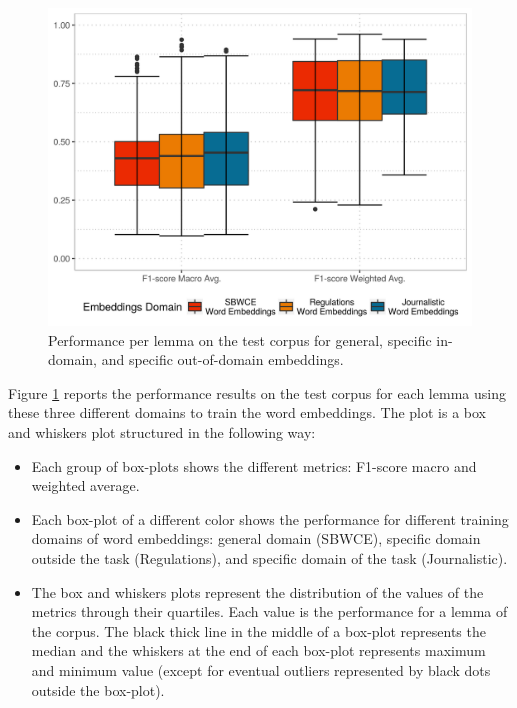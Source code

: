 \begin{figure}[ht]
	\includegraphics[width=\textwidth]{plots/embeddings/general_vs_out_domain}
  \caption{Performance per lemma on the test corpus for general, specific
  in-domain, and specific out-of-domain embeddings.}
  \label{fig:embeddings:performance_general_out}
\end{figure}

Figure \ref{fig:embeddings:performance_general_out} reports the performance
results on the test corpus for each lemma using these three different domains
to train the word embeddings. The plot is a box and whiskers plot structured in
the following way:

\begin{itemize}
  \item Each group of box-plots shows the different metrics: F1-score macro
    and weighted average.
  \item Each box-plot of a different color shows the performance for
    different training domains of word embeddings: general domain (SBWCE),
    specific domain outside the task (Regulations), and specific domain of the
    task (Journalistic).
  \item The box and whiskers plots represent the distribution of the values of
    the metrics through their quartiles. Each value is the performance for a
    lemma of the corpus. The black thick line in the middle of a box-plot
    represents the median and the whiskers at the end of each box-plot
    represents maximum and minimum value (except for eventual outliers
    represented by black dots outside the box-plot).
\end{itemize}

